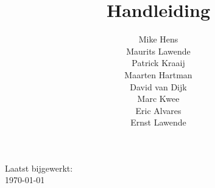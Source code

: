 \documentclass[11pt]{article}
\title{Handleiding \customerdomainuc}
\author{Mike Hens \\ Maurits Lawende \\ Patrick Kraaij \\ Maarten Hartman \\ David van Dijk \\ Marc Kwee \\ Eric Alvares \\ Ernst Lawende}
\date{}
\begin{document}
\maketitle
\begin{center}

Laatst bijgewerkt: \\ \ddmmyyyydate \today
\end{center}
\pagebreak

\renewcommand*\contentsname{Inhoudsopgave}
\tableofcontents
\pagebreak









\clearpage
\end{document}
